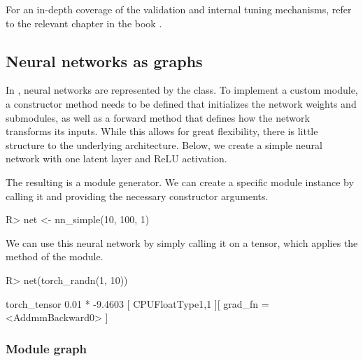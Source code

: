 \documentclass[article]{jss}
\theoremstyle{definition}
\begin{document}
For an in-depth coverage of the validation and internal tuning mechanisms, refer to the relevant  chapter in the  book \citep{ref-mlr3book-valid}.

\subsection{Neural networks as graphs}

In , neural networks are represented by the  class.
To implement a custom module, a constructor method needs to be defined that initializes the network weights and submodules, as well as a forward method that defines how the network transforms its inputs.
While this allows for great flexibility, there is little structure to the underlying architecture.
Below, we create a simple neural network with one latent layer and ReLU activation.


The resulting  is a module generator.
We can create a specific module instance by calling it and providing the necessary constructor arguments.

\begin{CodeInput}
R> net <- nn_simple(10, 100, 1)
\end{CodeInput}

We can use this neural network by simply calling it on a tensor, which applies the  method of the module.

\begin{CodeInput}
R> net(torch_randn(1, 10))
\end{CodeInput}

\begin{CodeOutput}
torch_tensor
0.01 *
-9.4603
[ CPUFloatType{1,1} ][ grad_fn = <AddmmBackward0> ]
\end{CodeOutput}

\subsubsection{Module graph}
\end{document}
